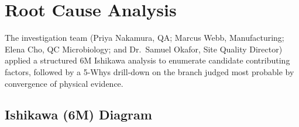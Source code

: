 
\section{Root Cause Analysis}

The investigation team (Priya Nakamura, QA; Marcus Webb, Manufacturing; Elena Cho, QC
Microbiology; and Dr.\ Samuel Okafor, Site Quality Director) applied a structured 6M
Ishikawa analysis to enumerate candidate contributing factors, followed by a 5-Whys
drill-down on the branch judged most probable by convergence of physical evidence.

\subsection{Ishikawa (6M) Diagram}

